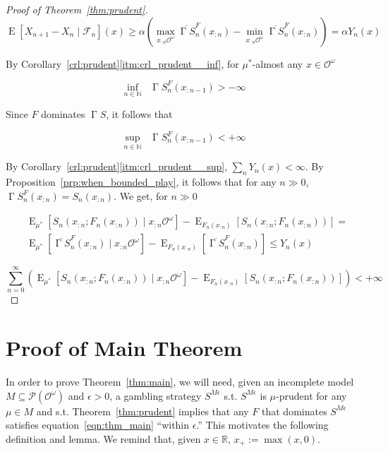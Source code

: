 \documentclass[aop,preprint]{imsart}
\numberwithin{equation}{section}
\theoremstyle{definition}
\theoremstyle{plain}
\newcommand{\Nats}{\mathbb{N}}
\newcommand{\Reals}{\mathbb{R}}
\DeclareMathOperator{\E}{E}
\newcommand{\PM}{\mathcal{P}}
\newcommand{\Ob}{\mathcal{O}}
\newcommand{\OO}{\Ob^\omega}
\newcommand{\PMO}{\PM(\OO)}
\DeclareMathOperator{\SVM}{\Sigma V_{\min}}
\DeclareMathOperator{\SVX}{\Sigma V_{\max}}
\DeclareMathOperator{\PG}{\Gamma}
\newcommand{\F}{\mathcal{F}}
\begin{document}
\begin{proof}[Proof of Theorem~\ref{thm:prudent}]
$$\E\left[X_{n+1} - X_n \mid \F_n\right]\left(x\right) \geq \alpha \left(\max_{x_{:n}\OO} \overline{\PG{S}}_{n}^F\left(x_{:n}\right) - \min_{x_{:n}\OO} \overline{\PG{S}}_{n}^F\left(x_{:n}\right)\right) = \alpha Y_n\left(x\right)$$

By Corollary~\ref*{crl:prudent}\ref{itm:crl_prudent__inf}, for $\mu^*$-almost any $x \in \OO$

\[\inf_{n \in \Nats} \SVM \PG{S}^F_{n}\left(x_{:n-1}\right) > -\infty\]

Since $F$ dominates $\PG{S}$, it follows that

\[\sup_{n \in \Nats} \SVX \PG{S}^F_{n}\left(x_{:n-1}\right) < +\infty\] 

By Corollary~\ref*{crl:prudent}\ref{itm:crl_prudent__sup}, $\sum_n Y_n\left(x\right) < \infty$. By Proposition~\ref{prp:when_bounded_play}, it follows that for any $n \gg 0$, $\PG{S}^F_n\left(x_{:n}\right) = S_n\left(x_{:n}\right)$. We get, for $n \gg 0$

\begin{align*}
&\E_{\mu^*}\left[S_n\left(x_{:n};F_n\left(x_{:n}\right)\right) \mid x_{:n}\OO\right]-\E_{F_n\left(x_{:n}\right)}\left[S_n\left(x_{:n};F_n\left(x_{:n}\right)\right)\right] = \\ 
&\E_{\mu^*}\left[\overline{\PG{S}}^F_n\left(x_{:n}\right) \mid x_{:n}\OO\right]-\E_{F_n\left(x_{:n}\right)}\left[\overline{\PG{S}}^F_n\left(x_{:n}\right)\right] \leq Y_n\left(x\right)
\end{align*}

$$\sum_{n=0}^\infty \left(\E_{\mu^*}\left[S_n\left(x_{:n};F_n\left(x_{:n}\right)\right) \mid x_{:n}\OO\right]-\E_{F_n\left(x_{:n}\right)}\left[S_n\left(x_{:n};F_n\left(x_{:n}\right)\right)\right]\right) < +\infty$$
\end{proof}

\section{Proof of Main Theorem}
\label{sec:construction}

In order to prove Theorem~\ref{thm:main}, we will need, given an incomplete model $M \subseteq \PMO$ and $\epsilon > 0$, a gambling strategy $S^{M\epsilon}$ s.t. $S^{M\epsilon}$ is $\mu$-prudent for any $\mu \in M$ and s.t. Theorem~\ref{thm:prudent} implies that any $F$ that dominates $S^{M\epsilon}$ satisfies equation~\ref{eqn:thm_main} \enquote{within $\epsilon$.} This motivates the following definition and lemma. We remind that, given $x \in \Reals$, $x_+:=\max(x,0)$.
\end{document}
